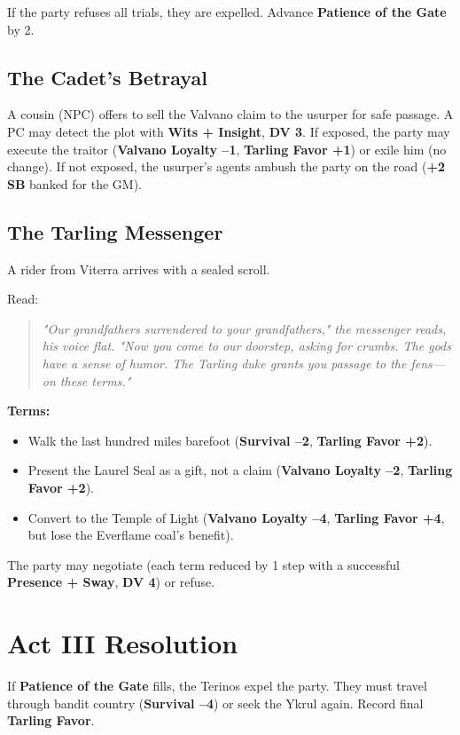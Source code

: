 \documentclass[11pt]{book}
\begin{document}
If the party refuses all trials, they are expelled. Advance \textbf{Patience of the Gate} by 2.

\subsection*{The Cadet's Betrayal}
A cousin (NPC) offers to sell the Valvano claim to the usurper for safe passage. A PC may detect the plot with \textbf{Wits + Insight}, \textbf{DV 3}. If exposed, the party may execute the traitor (\textbf{Valvano Loyalty --1}, \textbf{Tarling Favor +1}) or exile him (no change). If not exposed, the usurper's agents ambush the party on the road (\textbf{+2 SB} banked for the GM).

\subsection*{The Tarling Messenger}
A rider from Viterra arrives with a sealed scroll.

Read:
\begin{quote}
\emph{"Our grandfathers surrendered to your grandfathers," the messenger reads, his voice flat. "Now you come to our doorstep, asking for crumbs. The gods have a sense of humor. The Tarling duke grants you passage to the fens---on these terms."}
\end{quote}

\textbf{Terms:}
\begin{itemize}
    \item Walk the last hundred miles barefoot (\textbf{Survival --2}, \textbf{Tarling Favor +2}).
    \item Present the Laurel Seal as a gift, not a claim (\textbf{Valvano Loyalty --2}, \textbf{Tarling Favor +2}).
    \item Convert to the Temple of Light (\textbf{Valvano Loyalty --4}, \textbf{Tarling Favor +4}, but lose the Everflame coal's benefit).
\end{itemize}

The party may negotiate (each term reduced by 1 step with a successful \textbf{Presence + Sway}, \textbf{DV 4}) or refuse.

\section*{Act III Resolution}
If \textbf{Patience of the Gate} fills, the Terinos expel the party. They must travel through bandit country (\textbf{Survival --4}) or seek the Ykrul again. Record final \textbf{Tarling Favor}.
\end{document}
